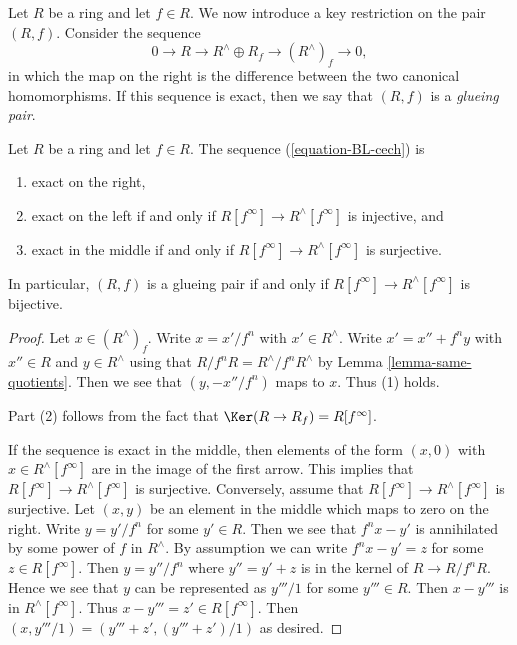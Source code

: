 \noindent
Let $R$ be a ring and let $f \in R$. We now introduce a key restriction on
the pair $(R, f)$. Consider the sequence
\begin{equation}
\label{equation-BL-cech}
0 \to R \to R^\wedge \oplus R_f \to (R^\wedge)_f \to 0,
\end{equation}
in which the map on the right is the difference between the two canonical 
homomorphisms. If this sequence is exact, then
we say that $(R,f)$ is a \emph{glueing pair}. 

\begin{lemma}
\label{lemma-same-f-torsion}
Let $R$ be a ring and let $f \in R$. The sequence (\ref{equation-BL-cech})
is
\begin{enumerate}
\item exact on the right,
\item exact on the left if and only if $R[f^\infty] \to R^\wedge[f^\infty]$
is injective, and
\item exact in the middle if and only if $R[f^\infty] \to R^\wedge[f^\infty]$
is surjective.
\end{enumerate}
In particular, $(R, f)$ is a glueing pair if and only if
$R[f^\infty] \to R^\wedge[f^\infty]$ is bijective.
\end{lemma}

\begin{proof}
Let $x \in (R^\wedge)_f$. Write $x = x'/f^n$ with $x' \in R^\wedge$.
Write $x' = x'' + f^n y$ with $x'' \in R$ and $y \in R^\wedge$
using that $R/f^nR = R^\wedge/f^nR^\wedge$ by Lemma \ref{lemma-same-quotients}.
Then we see that $(y, -x''/f^n)$ maps to $x$. Thus (1) holds.

\medskip\noindent
Part (2) follows from the fact that $\Ker(R \to R_f) = R[f^\infty]$.

\medskip\noindent
If the sequence is exact in the middle, then elements of the form
$(x, 0)$ with $x \in R^\wedge[f^\infty]$ are in the image of
the first arrow. This implies that $R[f^\infty] \to R^\wedge[f^\infty]$
is surjective. Conversely, assume that $R[f^\infty] \to R^\wedge[f^\infty]$
is surjective. Let $(x, y)$ be an element in the middle
which maps to zero on the right. Write $y = y'/f^n$ for some $y' \in R$.
Then we see that $f^n x - y'$ is annihilated by some power of $f$ in
$R^\wedge$. By assumption we can write $f^nx - y' = z$ for some
$z \in R[f^\infty]$. Then $y = y''/f^n$ where $y'' = y' + z$
is in the kernel of $R \to R/f^nR$. Hence we see that $y$ can be
represented as $y'''/1$ for some $y''' \in R$. Then
$x - y'''$ is in $R^\wedge[f^\infty]$. Thus $x - y''' = z' \in R[f^\infty]$.
Then $(x, y'''/1) = (y''' + z', (y''' + z')/1)$ as desired.
\end{proof}

